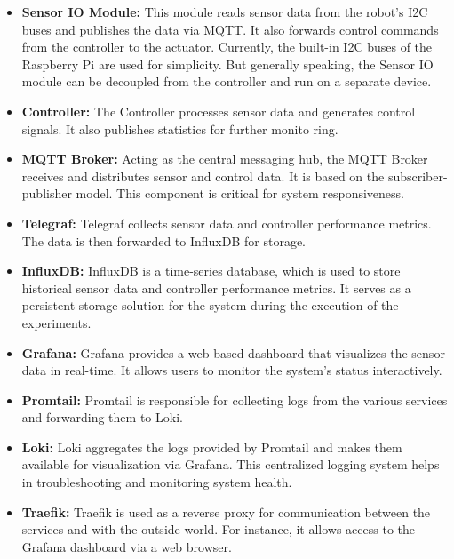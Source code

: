 \begin{itemize}
    \item \textbf{Sensor IO Module:}
    This module reads sensor data from the robot's I2C buses and publishes the data via MQTT.
    It also forwards control commands from the controller to the actuator.
    Currently, the built-in I2C buses of the Raspberry Pi are used for simplicity.
    But generally speaking, the Sensor IO module can be decoupled from the controller and run on a separate device.

    \item \textbf{Controller:}
    The Controller processes sensor data and generates control signals.
    It also publishes statistics for further monito ring.

    \item \textbf{MQTT Broker:}
    Acting as the central messaging hub, the MQTT Broker receives and distributes sensor and control data.
    It is based on the subscriber-publisher model.
    This component is critical for system responsiveness.

    \item \textbf{Telegraf:}
    Telegraf collects sensor data and controller performance metrics.
    The data is then forwarded to InfluxDB for storage.

    \item \textbf{InfluxDB:}
    InfluxDB is a time-series database, which is used to store historical sensor data and controller performance metrics.
    It serves as a persistent storage solution for the system during the execution of the experiments.

    \item \textbf{Grafana:}
    Grafana provides a web-based dashboard that visualizes the sensor data in real-time.
    It allows users to monitor the system's status interactively.

    \item \textbf{Promtail:}
    Promtail is responsible for collecting logs from the various services and forwarding them to Loki.

    \item \textbf{Loki:}
    Loki aggregates the logs provided by Promtail and makes them available for visualization via Grafana.
    This centralized logging system helps in troubleshooting and monitoring system health.

    \item \textbf{Traefik:}
    Traefik is used as a reverse proxy for communication between the services and with the outside world.
    For instance, it allows access to the Grafana dashboard via a web browser.
\end{itemize}


